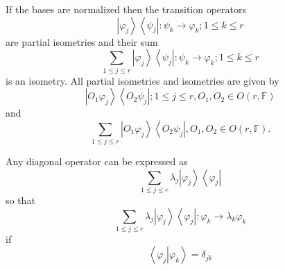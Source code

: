 \documentclass[aps,preprint]{revtex4}%
\begin{document}
If the bases are normalized then the transition operators%
\begin{equation}
\left\vert \varphi_{j}\right\rangle \left\langle \psi_{j}\right\vert :\psi
_{k}\rightarrow\varphi_{k};1\leq k\leq r
\end{equation}
are partial isometries and their sum
\begin{equation}%
{\textstyle\sum\limits_{1\leq j\leq r}}
\left\vert \varphi_{j}\right\rangle \left\langle \psi_{j}\right\vert :\psi
_{k}\rightarrow\varphi_{k};1\leq k\leq r
\end{equation}
is an isometry. All partial isometries and isometries are given by
\begin{equation}
\left\vert O_{1}\varphi_{j}\right\rangle \left\langle O_{2}\psi_{j}\right\vert
;1\leq j\leq r,O_{1},O_{2}\in O\left(  r,\mathbb{F}\right)
\end{equation}
and
\begin{equation}%
{\textstyle\sum\limits_{1\leq j\leq r}}
\left\vert O_{1}\varphi_{j}\right\rangle \left\langle O_{2}\psi_{j}\right\vert
,O_{1},O_{2}\in O\left(  r,\mathbb{F}\right)  .
\end{equation}


Any diagonal operator can be expressed as
\begin{equation}%
{\textstyle\sum\limits_{1\leq j\leq r}}
\lambda_{j}\left\vert \varphi_{j}\right\rangle \left\langle \varphi
_{j}\right\vert
\end{equation}
so that
\begin{equation}%
{\textstyle\sum\limits_{1\leq j\leq r}}
\lambda_{j}\left\vert \varphi_{j}\right\rangle \left\langle \varphi
_{j}\right\vert :\varphi_{k}\rightarrow\lambda_{k}\varphi_{k}%
\end{equation}
if
\begin{equation}
\left\langle \left.  \varphi_{j}\right\vert \varphi_{k}\right\rangle
=\delta_{jk}%
\end{equation}
\end{document}
